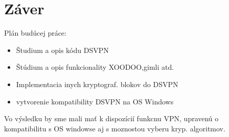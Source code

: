 
\chapter{Záver}
\label{summary}
Plán budúcej práce:
\begin{itemize}
	\item Študium a opis kódu DSVPN
	\item Štúdium a opis funkcionality XOODOO,gimli atd.
	\item Implementacia inych kryptograf. blokov do DSVPN
	\item vytvorenie kompatibility DSVPN na OS Windows
\end{itemize}

    
Vo výsledku by sme mali mať k dispozícií funkcnu VPN, upravenú o kompatibilitu s OS windowse aj s moznostou vyberu kryp. algoritmov.

